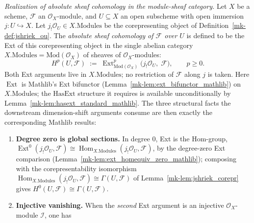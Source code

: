 \begin{definition}\label{mk-def:absolute_cohomology}
  \leanok

  \textit{Realization of absolute sheaf cohomology in the module-sheaf category.}
  Let \(X\) be a scheme, \(\mathcal{F}\) an \(\mathcal{O}_X\)-module, and \(U \subseteq
  X\) an open subscheme with open immersion \(j : U \hookrightarrow X\). Let
  \(j_!\mathcal{O}_U \in X.\mathrm{Modules}\) be the corepresenting object of
  Definition~\ref{mk-def:jshriek_ou}. The \emph{absolute sheaf cohomology of \(\mathcal{F}\)
  over \(U\)} is defined to be the Ext of this corepresenting object in the single
  abelian category \(X.\mathrm{Modules} = \mathrm{Mod}(\mathcal{O}_X)\) of sheaves of
  \(\mathcal{O}_X\)-modules:
  \[
    H^p(U, \mathcal{F}) \;:=\; \operatorname{Ext}^p_{\mathrm{Mod}(\mathcal{O}_X)}
      \bigl(j_!\mathcal{O}_U,\; \mathcal{F}\bigr),
    \qquad p \geq 0.
  \]
  Both Ext arguments live in \(X.\mathrm{Modules}\); no restriction of \(\mathcal{F}\)
  along \(j\) is taken. Here \(\operatorname{Ext}\) is Mathlib's Ext bifunctor
  (Lemma~\ref{mk-lem:ext_bifunctor_mathlib}) on \(X.\mathrm{Modules}\); the
  \(\mathrm{HasExt}\) structure it requires is available unconditionally by
  Lemma~\ref{mk-lem:hasext_standard_mathlib}. The three structural facts the downstream
  dimension-shift arguments consume are then exactly the corresponding Mathlib results:
  \begin{enumerate}
  \item \textbf{Degree zero is global sections.} In degree \(0\), Ext is the Hom-group,
    \(\operatorname{Ext}^0(j_!\mathcal{O}_U, \mathcal{F}) \cong
    \operatorname{Hom}_{X.\mathrm{Modules}}(j_!\mathcal{O}_U, \mathcal{F})\), by the
    degree-zero Ext comparison (Lemma~\ref{mk-lem:ext_homequiv_zero_mathlib}); composing
    with the corepresentability isomorphism
    \(\operatorname{Hom}_{X.\mathrm{Modules}}(j_!\mathcal{O}_U, \mathcal{F}) \cong
    \Gamma(U, \mathcal{F})\) of Lemma~\ref{mk-lem:jshriek_corepr} gives \(H^0(U,
    \mathcal{F}) \cong \Gamma(U, \mathcal{F})\).
  \item \textbf{Injective vanishing.} When the \emph{second} Ext argument is an
    injective \(\mathcal{O}_X\)-module \(\mathcal{I}\), one has

\end{enumerate}
\end{definition}
